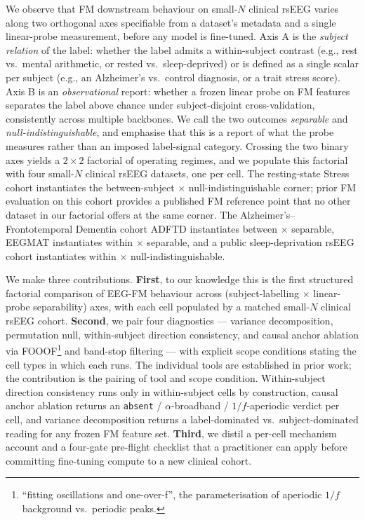 We observe that FM downstream behaviour on small-$N$ clinical rsEEG
varies along two orthogonal axes specifiable from a dataset's
metadata and a single linear-probe measurement, before any model is
fine-tuned. Axis A is the \emph{subject relation} of the label:
whether the label admits a within-subject contrast (e.g., rest vs.\
mental arithmetic, or rested vs.\ sleep-deprived) or is defined as a
single scalar per subject (e.g., an Alzheimer's vs.\ control
diagnosis, or a trait stress score). Axis B is an \emph{observational}
report: whether a frozen linear probe on FM features separates the
label above chance under subject-disjoint cross-validation,
consistently across multiple backbones. We call the two outcomes
\emph{separable} and \emph{null-indistinguishable}, and emphasise
that this is a report of what the probe measures rather than an
imposed label-signal category. Crossing the two binary axes yields a
$2\times 2$ factorial of operating regimes, and we populate this
factorial with four small-$N$ clinical rsEEG datasets, one per cell.
The resting-state Stress cohort \citep{komarov2020stress} instantiates
the between-subject $\times$ null-indistinguishable corner; prior FM
evaluation on this cohort \citep{wang2025stress} provides a published
FM reference point that no other dataset in our factorial offers at
the same corner. The Alzheimer's--Frontotemporal Dementia cohort
ADFTD \citep{adftd} instantiates between $\times$ separable, EEGMAT
\citep{eegmat} instantiates within $\times$ separable, and a public
sleep-deprivation rsEEG cohort \citep{xiang2025sleepdep} instantiates
within $\times$ null-indistinguishable.

We make three contributions. \textbf{First}, to our knowledge this
is the first structured factorial comparison of EEG-FM behaviour
across (subject-labelling $\times$ linear-probe separability) axes,
with each cell populated by a matched small-$N$ clinical rsEEG
cohort. \textbf{Second}, we pair four diagnostics --- variance
decomposition, permutation null, within-subject direction
consistency, and causal anchor ablation via
FOOOF\footnote{``fitting oscillations and one-over-f'', the
parameterisation of aperiodic $1/f$ background vs.\ periodic peaks.}
and band-stop filtering --- with explicit scope conditions stating
the cell types in which each runs. The individual tools are
established in prior work; the contribution is the pairing of tool
and scope condition. Within-subject direction consistency runs only
in within-subject cells by construction, causal anchor ablation
returns an \texttt{absent} / $\alpha$-broadband / $1/f$-aperiodic
verdict per cell, and variance decomposition returns a
label-dominated vs.\ subject-dominated reading for any frozen FM
feature set. \textbf{Third}, we distil a per-cell mechanism account
and a four-gate pre-flight checklist that a practitioner can apply
before committing fine-tuning compute to a new clinical cohort.

